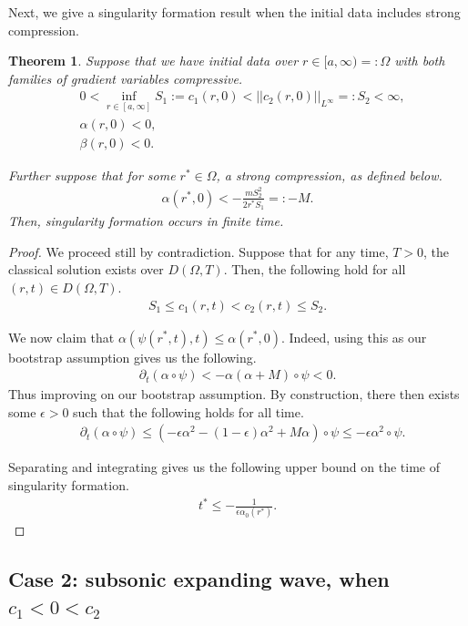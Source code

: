 \documentclass[11pt]{article}
\newtheorem{thm}{Theorem}[section]
\begin{document}
%
Next,  we give a singularity formation result when the initial data includes strong compression.

\begin{thm}
	Suppose that we have initial data over $r\in[a,\infty)=:\Omega$ with both families of gradient variables compressive. 	
	\begin{align}
		&0<\inf_{r\in[a,\infty]} S_1 := {c_1(r,0)} <||c_2(r,0)||_{L^\infty} =: S_2 < \infty, 
		\\
		&\alpha(r,0) < 0, 
		\\
		&\beta(r,0) < 0. 
	\end{align} 
	
	Further suppose that for some $r^* \in \Omega$, a strong compression, as defined below. 
	\begin{align}
		\alpha(r^*, 0) < -\frac{mS_2^2}{2r^*S_1} =: -M.
	\end{align}	
	Then, singularity formation occurs in finite time. 
\end{thm} 
\begin{proof}
We proceed still by contradiction. Suppose that for any time, $T>0$, the classical solution exists over $D(\Omega,T)$. Then, the following hold for all $(r,t) \in D(\Omega,T)$. 
\begin{align}
	S_1 \leq c_1(r,t) < c_2(r,t) \leq S_2.
\end{align} 

We now claim that $\alpha(\psi(r^*,t),t) \leq \alpha(r^*,0)$. Indeed, using this as our bootstrap assumption gives us the following. 
\begin{align}
	\partial_t(\alpha\circ\psi) < -\alpha(\alpha + M)\circ\psi < 0. 
\end{align} 
Thus improving on our bootstrap assumption. By construction, there then exists some $\epsilon > 0$ such that the following holds for all time. 
\begin{align}
	&\partial_t(\alpha\circ\psi) \leq (-\epsilon\alpha^2 
	- (1-\epsilon)\alpha^2 + M\alpha)\circ\psi \leq -\epsilon\alpha^2 \circ\psi. 
\end{align} 

Separating and integrating gives us the following upper bound on the time of singularity formation. 
\begin{align}
	t^* \leq -\frac{1}{\epsilon\alpha_0(r^*)}.
\end{align}

\end{proof} 

\subsection{Case 2: subsonic expanding wave, when $c_1<0<c_2$}
\end{document}
